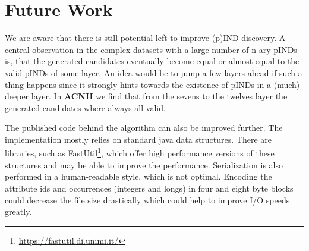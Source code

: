\section{Future Work}
We are aware that there is still potential left to improve (p)IND discovery. A central observation in the complex datasets with a large number of n-ary pINDs is, that the generated candidates eventually become equal or almost equal to the valid pINDs of some layer. An idea would be to jump a few layers ahead if such a thing happens since it strongly hints towards the existence of pINDs in a (much) deeper layer. In \textbf{ACNH} we find that from the sevens to the twelves layer the generated candidates where always all valid.

The published code behind the algorithm can also be improved further. The implementation mostly relies on standard java data structures. There are libraries, such as FastUtil\footnote{\url{https://fastutil.di.unimi.it/}}, which offer high performance versions of these structures and may be able to improve the performance. Serialization is also performed in a human-readable style, which is not optimal. Encoding the attribute ids and occurrences (integers and longs) in four and eight byte blocks could decrease the file size drastically which could help to improve I/O speeds greatly.